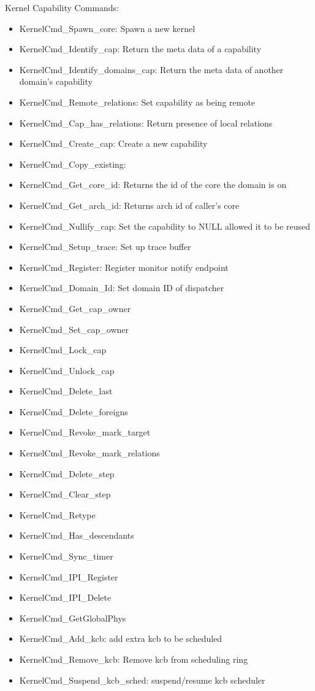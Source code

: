 \documentclass[a4paper,11pt,twoside]{report}
\begin{document}
{{Kernel Capability Commands:
\begin{itemize}
\item KernelCmd\_Spawn\_core: Spawn a new kernel
\item KernelCmd\_Identify\_cap: Return the meta data of a capability
\item KernelCmd\_Identify\_domains\_cap: Return the meta data of another domain's capability
\item KernelCmd\_Remote\_relations: Set capability as being remote
\item KernelCmd\_Cap\_has\_relations: Return presence of local relations
\item KernelCmd\_Create\_cap: Create a new capability
\item KernelCmd\_Copy\_existing:
\item KernelCmd\_Get\_core\_id: Returns the id of the core the domain is on
\item KernelCmd\_Get\_arch\_id: Returns arch id of caller's core
\item KernelCmd\_Nullify\_cap: Set the capability to NULL allowed it to be reused
\item KernelCmd\_Setup\_trace: Set up trace buffer
\item KernelCmd\_Register: Register monitor notify endpoint
\item KernelCmd\_Domain\_Id: Set domain ID of dispatcher
\item KernelCmd\_Get\_cap\_owner
\item KernelCmd\_Set\_cap\_owner
\item KernelCmd\_Lock\_cap
\item KernelCmd\_Unlock\_cap
\item KernelCmd\_Delete\_last
\item KernelCmd\_Delete\_foreigns
\item KernelCmd\_Revoke\_mark\_target
\item KernelCmd\_Revoke\_mark\_relations
\item KernelCmd\_Delete\_step
\item KernelCmd\_Clear\_step
\item KernelCmd\_Retype
\item KernelCmd\_Has\_descendants
\item KernelCmd\_Sync\_timer
\item KernelCmd\_IPI\_Register
\item KernelCmd\_IPI\_Delete
\item KernelCmd\_GetGlobalPhys
\item KernelCmd\_Add\_kcb: add extra kcb to be scheduled
\item KernelCmd\_Remove\_kcb: Remove kcb from scheduling ring
\item KernelCmd\_Suspend\_kcb\_sched: suspend/resume kcb scheduler
\end{itemize}

}}
\end{document}
